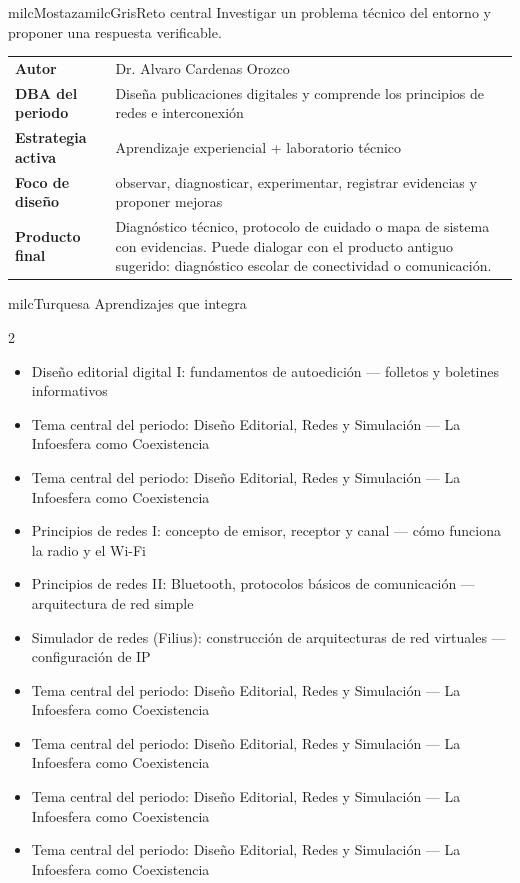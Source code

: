 \documentclass[11pt,letterpaper]{article}
\begin{document}
\begin{softbox}{milcMostaza}{milcGris}{Reto central}
Investigar un problema técnico del entorno y proponer una respuesta verificable.
\end{softbox}

\begin{tabularx}{\textwidth}{>{\bfseries}p{3.4cm}X}
\rowcolor{milcMagenta!12}Autor & Dr. Alvaro Cardenas Orozco\\
DBA del periodo & Diseña publicaciones digitales y comprende los principios de redes e interconexión\\
Estrategia activa & Aprendizaje experiencial + laboratorio técnico\\
Foco de diseño & observar, diagnosticar, experimentar, registrar evidencias y proponer mejoras\\
Producto final & Diagnóstico técnico, protocolo de cuidado o mapa de sistema con evidencias. Puede dialogar con el producto antiguo sugerido: diagnóstico escolar de conectividad o comunicación.\\
\end{tabularx}

\begin{titlebox}{milcTurquesa}
Aprendizajes que integra
\end{titlebox}
\begin{multicols}{2}
\begin{itemize}[leftmargin=*]
\item Diseño editorial digital I: fundamentos de autoedición — folletos y boletines informativos
\item Tema central del periodo: Diseño Editorial, Redes y Simulación — La Infoesfera como Coexistencia
\item Tema central del periodo: Diseño Editorial, Redes y Simulación — La Infoesfera como Coexistencia
\item Principios de redes I: concepto de emisor, receptor y canal — cómo funciona la radio y el Wi-Fi
\item Principios de redes II: Bluetooth, protocolos básicos de comunicación — arquitectura de red simple
\item Simulador de redes (Filius): construcción de arquitecturas de red virtuales — configuración de IP
\item Tema central del periodo: Diseño Editorial, Redes y Simulación — La Infoesfera como Coexistencia
\item Tema central del periodo: Diseño Editorial, Redes y Simulación — La Infoesfera como Coexistencia
\item Tema central del periodo: Diseño Editorial, Redes y Simulación — La Infoesfera como Coexistencia
\item Tema central del periodo: Diseño Editorial, Redes y Simulación — La Infoesfera como Coexistencia
\end{itemize}
\end{multicols}
\end{document}
